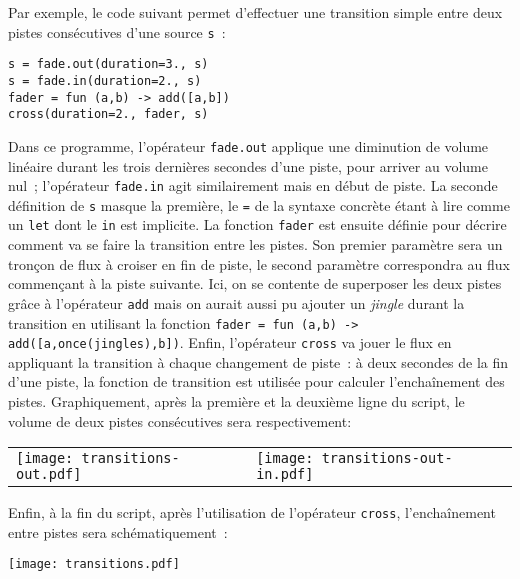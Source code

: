 \documentclass[twoside]{article}
\theoremstyle{plain}
\theoremstyle{definition}
\theoremstyle{remark}
\begin{document}
Par exemple, le code suivant permet d'effectuer une transition simple entre deux
pistes consécutives d'une source \texttt{s}~:
\begin{verbatim}
s = fade.out(duration=3., s)
s = fade.in(duration=2., s)
fader = fun (a,b) -> add([a,b])
cross(duration=2., fader, s)
\end{verbatim}
Dans ce programme, l'opérateur \texttt{fade.out} applique une diminution de
volume linéaire durant les trois dernières secondes d'une piste, pour arriver au
volume nul~; l'opérateur \texttt{fade.in} agit similairement mais en début de
piste. La seconde définition de \texttt{s} masque la première, le \verb.=. de la
syntaxe concrète étant à lire comme un \verb.let. dont le \verb.in. est
implicite. La fonction \texttt{fader} est ensuite définie pour décrire comment
va se faire la transition entre les pistes. Son premier paramètre sera un
tronçon de flux à croiser en fin de piste, le second paramètre correspondra au
flux commençant à la piste suivante. Ici, on se contente de superposer les deux
pistes grâce à l'opérateur \texttt{add} mais on aurait aussi pu ajouter un
\emph{jingle} durant la transition en utilisant la fonction
\verb+fader = fun (a,b) -> add([a,once(jingles),b])+. Enfin, l'opérateur
\texttt{cross} va jouer le flux en appliquant la transition
à chaque changement de piste~: à deux secondes de
la fin d'une piste, la fonction de transition est utilisée pour calculer
l'enchaînement des pistes. Graphiquement, après la première et la deuxième ligne
du script, le volume de deux pistes consécutives sera respectivement:
\begin{center}
  \begin{tabular}{ll}
    \texttt{[image: transitions-out.pdf]}
    &
    \texttt{[image: transitions-out-in.pdf]}
    \\
  \end{tabular}
\end{center}
Enfin, à la fin du script, après l'utilisation de l'opérateur \texttt{cross},
l'enchaînement entre pistes sera schématiquement~:
\begin{center}
  \texttt{[image: transitions.pdf]}
\end{center}

\end{document}
